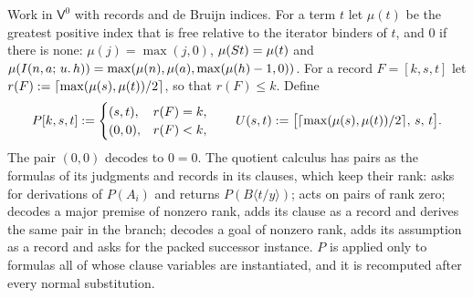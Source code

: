 Work in $\mathsf{V}^{0}$ with records and de Bruijn indices. For a term $t$
let $\mu(t)$ be the greatest positive index that is free relative to the
iterator binders of $t$, and $0$ if there is none:
$\mu(j)=\max(j,0)$, $\mu(S t)=\mu(t)$ and
$\mu(I(n,a;\,u.\,h))=\max(\mu(n),\mu(a),\max(\mu(h)-1,0))$. For a record
$F=[k,s,t]$ let $r(F)\mathrel{:=}\lceil\max(\mu(s),\mu(t))/2\rceil$, so that
$r(F)\le k$. Define
\[
 P[k,s,t]\mathrel{:=}
 \begin{cases}
 (s,t),&r(F)=k,\\
 (0,0),&r(F)<k,
 \end{cases}
 \qquad
 U(s,t)\mathrel{:=}\bigl[\lceil\max(\mu(s),\mu(t))/2\rceil,\,s,\,t\bigr].
\]
The pair $(0,0)$ decodes to $0=0$. The quotient calculus has pairs as the
formulas of its judgments and records in its clauses, which keep their
rank:  asks for derivations of $P(A_i)$ and returns
$P(B\langle t/y\rangle)$;  acts on pairs of rank zero;
 decodes a major premise of nonzero rank, adds its clause as
a record and derives the same pair in the branch;  decodes
a goal of nonzero rank, adds its assumption as a record and asks for the
packed successor instance. $P$ is applied only to formulas all of whose
clause variables are instantiated, and it is recomputed after every
normal substitution.

